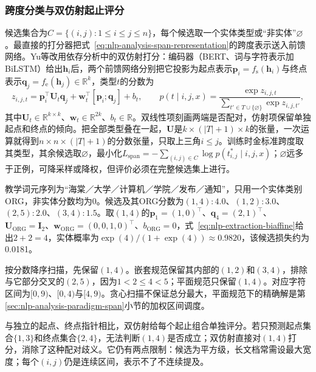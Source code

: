 \subsubsection{跨度分类与双仿射起止评分}
\label{sec:nlp-extraction-biaffine}

候选集合为$C=\{(i,j):1\leq i\leq j\leq n\}$，每个候选取一个实体类型或“非实体”$\varnothing$。最直接的打分器把式~\eqref{eq:nlp-analysis-span-representation}的跨度表示送入前馈网络。Yu等改用依存分析中的双仿射打分：编码器（BERT、词与字符表示加BiLSTM）给出$\bm h_i$后，两个前馈网络分别把它投影为起点表示$\bm p_i=f_{\mathrm s}(\bm h_i)$与终点表示$\bm q_j=f_{\mathrm e}(\bm h_j)\in\mathbb R^{k}$，类型$t$的分数为
\begin{equation}
  z_{i,j,t}=
  \bm p_i^\top\bm U_t\bm q_j+
  \bm w_t^\top[\bm p_i;\bm q_j]+b_t,
  \qquad
  p(t\mid i,j,x)=
  \frac{\exp z_{i,j,t}}{\sum_{t'\in T\cup\{\varnothing\}}\exp z_{i,j,t'}},
  \label{eq:nlp-extraction-biaffine}
\end{equation}
其中$\bm U_t\in\mathbb R^{k\times k}$、$\bm w_t\in\mathbb R^{2k}$、$b_t\in\mathbb R$。双线性项刻画两端是否配对，仿射项保留单独起点和终点的倾向。把全部类型叠在一起，$\bm U$是$k\times(|T|+1)\times k$的张量，一次运算就得到$n\times n\times(|T|+1)$的分数张量，只取上三角$i\leq j$。训练时金标准跨度取其类型，其余候选取$\varnothing$，最小化$L_{\mathrm{span}}=-\sum_{(i,j)\in C}\log p(t^{*}_{i,j}\mid i,j,x)$；$\varnothing$远多于正例，可降采样或降权，但评价必须在完整候选集上进行。

\begin{example}[嵌套候选怎样保留]
\label{ex:nlp-extraction-nested}
教学词元序列为“海棠／大学／计算机／学院／发布／通知”，只用一个实体类别ORG，非实体分数均为0。候选及其ORG分数为$(1,4):4.0$、$(1,2):3.0$、$(2,5):2.0$、$(3,4):1.5$。取$(1,4)$的$\bm p_1=(1,0)^\top$、$\bm q_4=(2,1)^\top$、$\bm U_{\mathrm{ORG}}=\bm I_2$、$\bm w_{\mathrm{ORG}}=(0,0,1,0)^\top$、$b_{\mathrm{ORG}}=0$，式~\eqref{eq:nlp-extraction-biaffine}给出$2+2=4$，实体概率为$\exp(4)/(1+\exp(4))\approx0.9820$，该候选损失约为0.0181。

按分数降序扫描，先保留$(1,4)$。嵌套规范保留其内部的$(1,2)$和$(3,4)$，排除与它部分交叉的$(2,5)$，因为$1<2\leq4<5$；平面规范只保留$(1,4)$。对应字符区间为$[0,9)$、$[0,4)$与$[4,9)$。贪心扫描不保证总分最大，平面规范下的精确解是第\ref{sec:nlp-analysis-paradigm-span}小节的加权区间调度。
\end{example}

与独立的起点、终点指针相比，双仿射给每个起止组合单独评分。若只预测起点集合$\{1,3\}$和终点集合$\{2,4\}$，无法判断$(1,4)$是否成立；双仿射直接对$(1,4)$打分，消除了这种配对歧义。它仍有两点限制：候选为平方级，长文档常需设最大宽度；每个$(i,j)$仍是连续区间，表示不了不连续提及。

